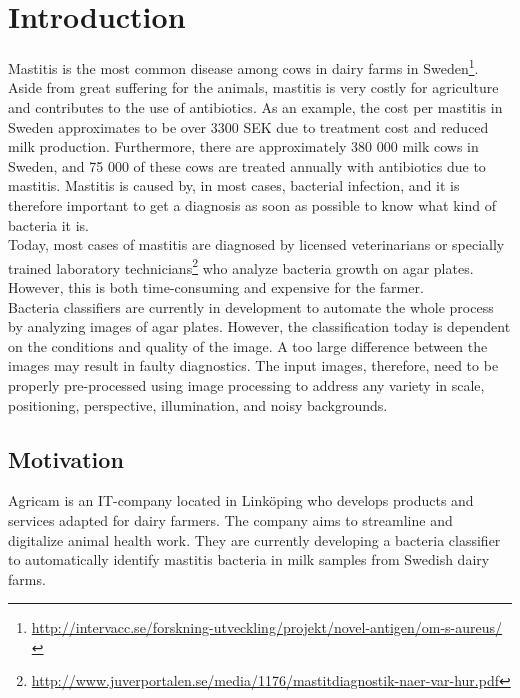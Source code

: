 \chapter{Introduction}
Mastitis is the most common disease among cows in dairy farms in Sweden\footnote{\url{http://intervacc.se/forskning-utveckling/projekt/novel-antigen/om-s-aureus/}}. Aside from great suffering for the animals, mastitis is very costly for agriculture and contributes to the use of antibiotics. As an example, the cost per mastitis in Sweden approximates to be over 3300 SEK due to treatment cost and reduced milk production. Furthermore, there are approximately 380 000 milk cows in Sweden, and 75 000 of these cows are treated annually with antibiotics due to mastitis. Mastitis is caused by, in most cases, bacterial infection, and it is therefore important to get a diagnosis as soon as possible to know what kind of bacteria it is. \\ 

\noindent Today, most cases of mastitis are diagnosed by licensed veterinarians or specially trained laboratory technicians\footnote{\url{http://www.juverportalen.se/media/1176/mastitdiagnostik-naer-var-hur.pdf}} who analyze bacteria growth on agar plates. However, this is both time-consuming and expensive for the farmer. \\

\noindent Bacteria classifiers are currently in development to automate the whole process by analyzing images of agar plates. However, the classification today is dependent on the conditions and quality of the image. A too large difference between the images may result in faulty diagnostics. The input images, therefore, need to be properly pre-processed using image processing to address any variety in scale, positioning, perspective, illumination, and noisy backgrounds.  


\section{Motivation}
Agricam is an IT-company located in Linköping who develops products and services adapted for dairy farmers. The company aims to streamline and digitalize animal health work. They are currently developing a bacteria classifier to automatically identify mastitis bacteria in milk samples from Swedish dairy farms. \\

